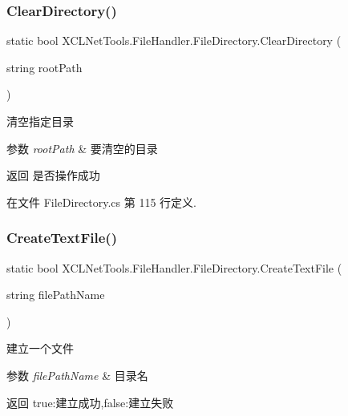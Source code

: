 \subsubsection{\texorpdfstring{Clear\+Directory()}{ClearDirectory()}}
{\footnotesize\ttfamily static bool X\+C\+L\+Net\+Tools.\+File\+Handler.\+File\+Directory.\+Clear\+Directory (\begin{DoxyParamCaption}\item[{string}]{root\+Path }\end{DoxyParamCaption})\hspace{0.3cm}{\ttfamily [static]}}



清空指定目录 


\begin{DoxyParams}{参数}
{\em root\+Path} & 要清空的目录\\
\hline
\end{DoxyParams}
\begin{DoxyReturn}{返回}
是否操作成功
\end{DoxyReturn}


在文件 File\+Directory.\+cs 第 115 行定义.

\mbox{\label{class_x_c_l_net_tools_1_1_file_handler_1_1_file_directory_a40110c2de9ef47ac099acdbbf0703a0c}} 
\subsubsection{\texorpdfstring{Create\+Text\+File()}{CreateTextFile()}}
{\footnotesize\ttfamily static bool X\+C\+L\+Net\+Tools.\+File\+Handler.\+File\+Directory.\+Create\+Text\+File (\begin{DoxyParamCaption}\item[{string}]{file\+Path\+Name }\end{DoxyParamCaption})\hspace{0.3cm}{\ttfamily [static]}}



建立一个文件 


\begin{DoxyParams}{参数}
{\em file\+Path\+Name} & 目录名\\
\hline
\end{DoxyParams}
\begin{DoxyReturn}{返回}
true\+:建立成功,false\+:建立失败
\end{DoxyReturn}



